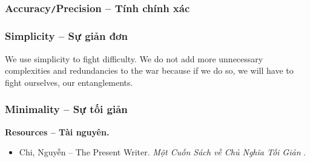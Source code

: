 \documentclass[12pt]{article}
\begin{document}
\subsubsection{Accuracy{\tt/}Precision -- Tính chính xác}

\subsubsection{Simplicity -- Sự giản đơn}
We use simplicity to fight difficulty. We do not add more unnecessary complexities and redundancies to the war because if we do so, we will have to fight ourselves, our entanglements.

\subsubsection{Minimality -- Sự tối giản}
\noindent\textbf{\textsf{Resources -- Tài nguyên.}}
\begin{itemize}
	\item {\sc Chi, Nguyễn -- The Present Writer}. {\it Một Cuốn Sách về Chủ Nghĩa Tối Giản} \cite{Chi2022}.
\end{itemize}
\end{document}
